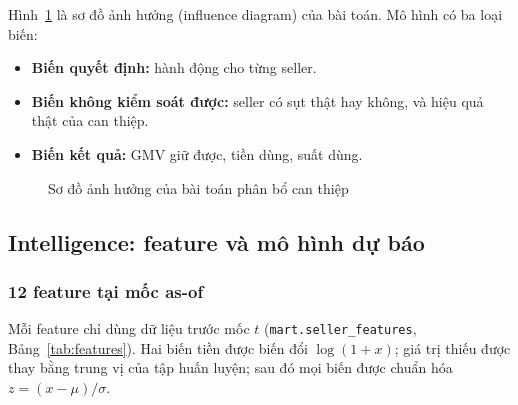 Hình~\ref{fig:influence} là sơ đồ ảnh hưởng (influence diagram) của bài toán. Mô hình có ba loại biến:
\begin{itemize}
    \item \textbf{Biến quyết định:} hành động cho từng seller.
    \item \textbf{Biến không kiểm soát được:} seller có sụt thật hay không, và hiệu quả thật của can thiệp.
    \item \textbf{Biến kết quả:} GMV giữ được, tiền dùng, suất dùng.
\end{itemize}

\begin{figure}[htbp]
\centering
\resizebox{0.95\textwidth}{!}{}
\caption{Sơ đồ ảnh hưởng của bài toán phân bổ can thiệp}
\label{fig:influence}
\end{figure}

\subsection{Intelligence: feature và mô hình dự báo}
\subsubsection*{12 feature tại mốc as-of}
Mỗi feature chỉ dùng dữ liệu trước mốc $t$ (\texttt{mart.seller\_features}, Bảng~\ref{tab:features}). Hai biến tiền được biến đổi $\log(1+x)$; giá trị thiếu được thay bằng trung vị của tập huấn luyện; sau đó mọi biến được chuẩn hóa $z = (x - \mu)/\sigma$.

